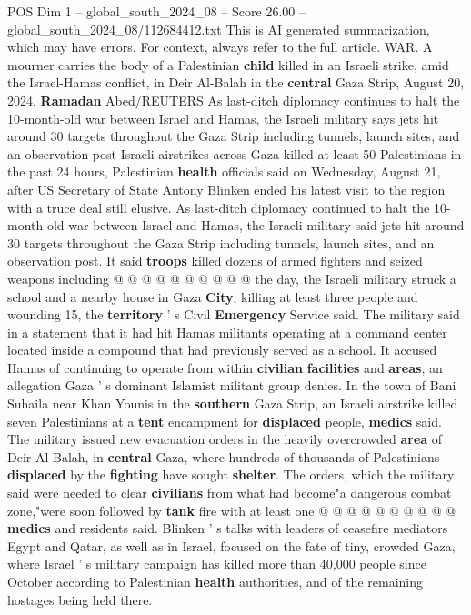 \begin{textsample}{POS Dim 1 – global\_south\_2024\_08 – Score 26.00 – global\_south\_2024\_08/112684412.txt}  \label{ex:f1_pos_328}
This is AI generated summarization, which may have errors.
For context, always refer to the full article.
WAR.
A mourner carries the body of a Palestinian \textbf{child} killed in an Israeli strike, amid the Israel-Hamas conflict, in Deir Al-Balah in the \textbf{central} Gaza Strip, August 20, 2024. \textbf{Ramadan} Abed/REUTERS As last-ditch diplomacy continues to halt the 10-month-old war between Israel and Hamas, the Israeli military says jets hit around 30 targets throughout the Gaza Strip including tunnels, launch sites, and an observation post Israeli airstrikes across Gaza killed at least 50 Palestinians in the past 24 hours, Palestinian \textbf{health} officials said on Wednesday, August 21, after US Secretary of State Antony Blinken ended his latest visit to the region with a truce deal still elusive.
As last-ditch diplomacy continued to halt the 10-month-old war between Israel and Hamas, the Israeli military said jets hit around 30 targets throughout the Gaza Strip including tunnels, launch sites, and an observation post.
It said \textbf{troops} killed dozens of armed fighters and seized weapons including @ @ @ @ @ @ @ @ @ @ the day, the Israeli military struck a school and a nearby house in Gaza \textbf{City}, killing at least three people and wounding 15, the \textbf{territory} ' s Civil \textbf{Emergency} Service said.
The military said in a statement that it had hit Hamas militants operating at a command center located inside a compound that had previously served as a school.
It accused Hamas of continuing to operate from within \textbf{civilian} \textbf{facilities} and \textbf{areas}, an allegation Gaza ' s dominant Islamist militant group denies.
In the town of Bani Suhaila near Khan Younis in the \textbf{southern} Gaza Strip, an Israeli airstrike killed seven Palestinians at a \textbf{tent} encampment for \textbf{displaced} people, \textbf{medics} said.
The military issued new evacuation orders in the heavily overcrowded \textbf{area} of Deir Al-Balah, in \textbf{central} Gaza, where hundreds of thousands of Palestinians \textbf{displaced} by the \textbf{fighting} have sought \textbf{shelter}.
The orders, which the military said were needed to clear \textbf{civilians} from what had become"a dangerous combat zone,"were soon followed by \textbf{tank} fire with at least one @ @ @ @ @ @ @ @ @ @ \textbf{medics} and residents said.
Blinken ' s talks with leaders of ceasefire mediators Egypt and Qatar, as well as in Israel, focused on the fate of tiny, crowded Gaza, where Israel ' s military campaign has killed more than 40,000 people since October according to Palestinian \textbf{health} authorities, and of the remaining hostages being held there.

\end{textsample}
